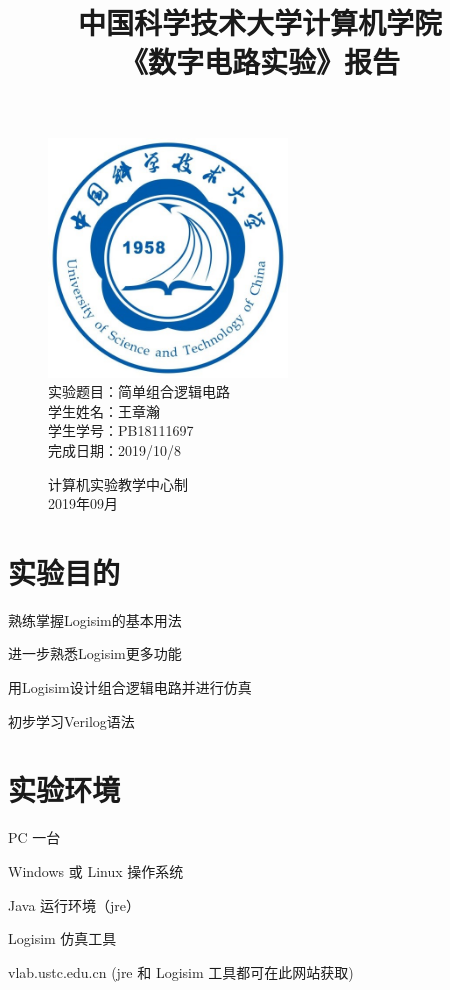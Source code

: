 \documentclass[UTF8]{article}
\title{中国科学技术大学计算机学院\\《数字电路实验》报告}
\author{}
\date{}
\begin{document}
	\maketitle
	\begin{figure}[H]
		\centering
		\includegraphics[width=2.5in]{xiaohui.jpg}\vspace{0.5cm}\\
		\large{
			实验题目：简单组合逻辑电路\\
			学生姓名：王章瀚\\
			学生学号：PB18111697\\
			完成日期：2019/10/8\\
		}\vspace{2cm}
		
		\large{计算机实验教学中心制\\2019年09月\\}
		\thispagestyle{empty}
		\clearpage  %
	\end{figure}


	\section{实验目的}
	熟练掌握Logisim的基本用法\par
	进一步熟悉Logisim更多功能\par
	用Logisim设计组合逻辑电路并进行仿真\par
	初步学习Verilog语法\par
	
	\section{实验环境}
	PC 一台\par
	Windows 或 Linux 操作系统\par
	Java 运行环境（jre）\par
	Logisim 仿真工具\par
	vlab.ustc.edu.cn (jre 和 Logisim 工具都可在此网站获取)\par
	
\end{document}
